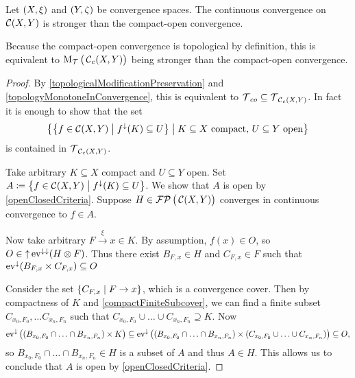 \begin{proposition} \label{continuousConvergenceCompactOpenComparison}
Let $\sSet{X,\xi}$ and $\sSet{Y,\zeta}$ be convergence spaces. The continuous convergence on $\operatorname{\mathcal{C}}(X,Y)$ is stronger than the compact-open convergence.
\end{proposition}
Because the compact-open convergence is topological by definition, this is equivalent to $\operatorname{M_\mathcal{T}}\big(\operatorname{\mathcal{C}}_c(X,Y)\big)$ being stronger than the compact-open convergence.
\begin{proof}
By \ref{topologicalModificationPreservation} and \ref{topologyMonotoneInConvergence}, this is equivalent to $\operatorname{\mathcal{T}}_{co}\subseteq \operatorname{\mathcal{T}}_{\operatorname{\mathcal{C}}_c(X,Y)}$.
In fact it is enough to show that the set
\[ \setbuilder[\big]{\setbuilder{f\in \cont(X,Y)}{f^\imf(K)\subseteq U}}{\text{$K\subseteq X$ compact, $U\subseteq Y$ open}} \]
is contained in $\operatorname{\mathcal{T}}_{\operatorname{\mathcal{C}}_c(X,Y)}$.

Take arbitrary $K\subseteq X$ compact and $U\subseteq Y$ open. Set $A \defeq \setbuilder{f\in \cont(X,Y)}{f^\imf(K)\subseteq U}$. We show that $A$ is open by \ref{openClosedCriteria}. Suppose $H\in \operatorname{\mathcal{FP}}\big(\operatorname{\mathcal{C}}(X,Y)\big)$ converges in continuous convergence to $f\in A$.

Now take arbitrary $F\overset{\xi}{\longrightarrow} x\in K$. By assumption, $f(x)\in O$, so $O\in \operatorname{\uparrow}\operatorname{ev}^{\downarrow\downarrow}(H\otimes F)$. Thus there exist $B_{F,x}\in H$ and $C_{F,x}\in F$ such that $\operatorname{ev}^\downarrow(B_{F,x}\times C_{F,x})\subseteq O$

Consider the set $\setbuilder{C_{F,x}}{F\to x}$, which is a convergence cover. Then by compactness of $K$ and \ref{compactFiniteSubcover}, we can find a finite subset $C_{x_0, F_0},\ldots C_{x_n, F_n}$ such that $C_{x_0, F_0} \cup \ldots \cup C_{x_n, F_n} \supseteq K$. Now 
\[ \operatorname{ev}^\downarrow\big((B_{x_0, F_0} \cap \ldots \cap B_{x_n, F_n})\times K\big) \subseteq \operatorname{ev}^\downarrow\big((B_{x_0, F_0} \cap \ldots \cap B_{x_n, F_n})\times (C_{x_0, F_0} \cup \ldots \cup C_{x_n, F_n})\big)\subseteq O, \]
so $B_{x_0, F_0} \cap \ldots \cap B_{x_n, F_n}\in H$ is a subset of $A$ and thus $A\in H$. This allows us to conclude that $A$ is open by \ref{openClosedCriteria}.
\end{proof}

